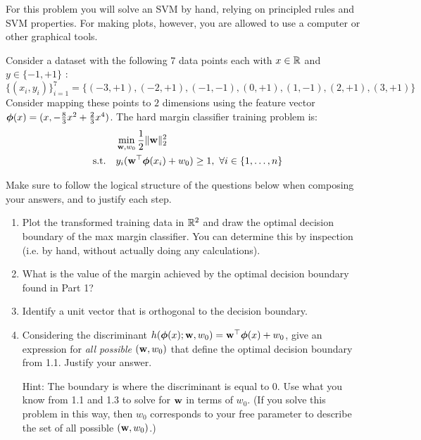 \documentclass[submit]{harvardml}
\begin{document}
\begin{problem}

  For this problem you will solve an SVM by hand, relying on principled rules and SVM properties. 
  For making plots, however, you are allowed to use a computer or other graphical tools.

Consider a dataset with the following 7 data points each with $x \in \mathbb{R}$ and $y \in \{ -1, +1 \}$ : \[\{(x_i, y_i)\}_{i = 1}^7 =\{(-3 , +1) , (-2 , +1 ) , (-1,  -1 ), (0, +1), ( 1 , -1 ), ( 2 , +1 ) , (3 , +1 )\}\] Consider
mapping these points to $2$ dimensions using the feature vector $\boldsymbol{\phi}(x) =  (x, -\frac{8}{3}x^2 + \frac{2}{3}x^4 )$. The hard margin classifier training problem is:
%
\begin{align*}
  &\min_{\mathbf{w}, w_0} \frac{1}{2}\|\mathbf{w}\|_2^2 \label{eq:dcp} \\
  \quad \text{s.t.} \quad & y_i(\mathbf{w}^\top \boldsymbol{\phi}(x_i) + w_0) \geq 1,~\forall i \in \{1,\ldots, n\}\notag
\end{align*}

Make sure to follow the logical structure of
the questions below when composing your answers, and to justify each step.

\begin{enumerate}
\item Plot the transformed training data in $\mathbb{R}^2$ and draw the
  optimal decision boundary of the max margin classifier. You can
  determine this by inspection (i.e. by hand, without actually doing
  any calculations).

\item What is the value of the margin achieved by the optimal decision
  boundary found in Part 1?

\item Identify a unit vector that is orthogonal to the decision boundary.

\item Considering the discriminant
  $h(\boldsymbol{\phi}(x);\mathbf{w},w_0)=\mathbf{w}^\top\boldsymbol{\phi}(x) +w_0$, give an
  expression for {\em all possible} $(\mathbf{w},w_0)$ that define the
  optimal decision boundary from 1.1.  Justify your answer.

  Hint: The boundary is where the discriminant is equal to 0.  Use
  what you know from 1.1 and 1.3 to solve for $\mathbf{w}$ in terms of
  $w_0$.  (If you solve this problem in this way, then $w_0$
  corresponds to your free parameter to describe the set of all
  possible $(\mathbf{w},w_0)$.)
  

\end{enumerate}
\end{problem}
\end{document}
